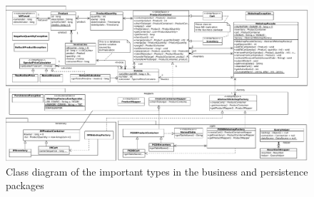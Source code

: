 \begin{figure}
  \includegraphics[width=\textwidth]{figures/webshop2015}
  \caption{\label{fig:classdiagram}Class diagram of the important types in the  business and
    persistence packages}
\end{figure}

\vspace{5\baselineskip}

